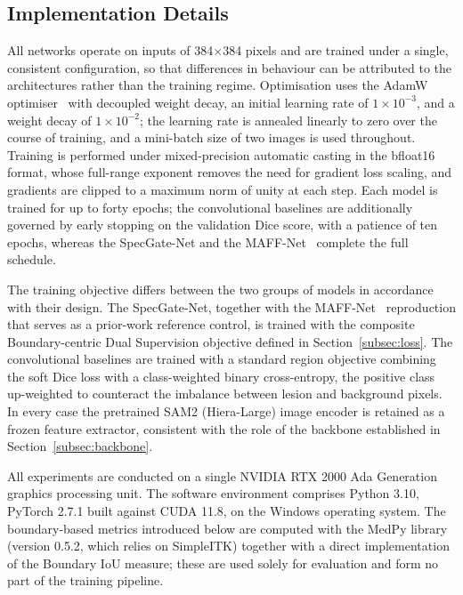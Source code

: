 \subsection{Implementation Details}
\label{subsec:impl}

All networks operate on inputs of 384$\times$384 pixels and are trained under a single, consistent configuration, so that differences in behaviour can be attributed to the architectures rather than the training regime. Optimisation uses the AdamW optimiser~\cite{ref33} with decoupled weight decay, an initial learning rate of $1\times10^{-3}$, and a weight decay of $1\times10^{-2}$; the learning rate is annealed linearly to zero over the course of training, and a mini-batch size of two images is used throughout. Training is performed under mixed-precision automatic casting in the bfloat16 format, whose full-range exponent removes the need for gradient loss scaling, and gradients are clipped to a maximum norm of unity at each step. Each model is trained for up to forty epochs; the convolutional baselines are additionally governed by early stopping on the validation Dice score, with a patience of ten epochs, whereas the SpecGate-Net and the MAFF-Net~\cite{ref15} complete the full schedule.

The training objective differs between the two groups of models in accordance with their design. The SpecGate-Net, together with the MAFF-Net~\cite{ref15} reproduction that serves as a prior-work reference control, is trained with the composite Boundary-centric Dual Supervision objective defined in Section~\ref{subsec:loss}. The convolutional baselines are trained with a standard region objective combining the soft Dice loss with a class-weighted binary cross-entropy, the positive class up-weighted to counteract the imbalance between lesion and background pixels. In every case the pretrained SAM2 (Hiera-Large) image encoder \cite{ref10} is retained as a frozen feature extractor, consistent with the role of the backbone established in Section~\ref{subsec:backbone}.

All experiments are conducted on a single NVIDIA RTX 2000 Ada Generation graphics processing unit. The software environment comprises Python 3.10, PyTorch 2.7.1 built against CUDA 11.8, on the Windows operating system. The boundary-based metrics introduced below are computed with the MedPy library (version 0.5.2, which relies on SimpleITK) \cite{ref23} together with a direct implementation of the Boundary IoU measure; these are used solely for evaluation and form no part of the training pipeline.

